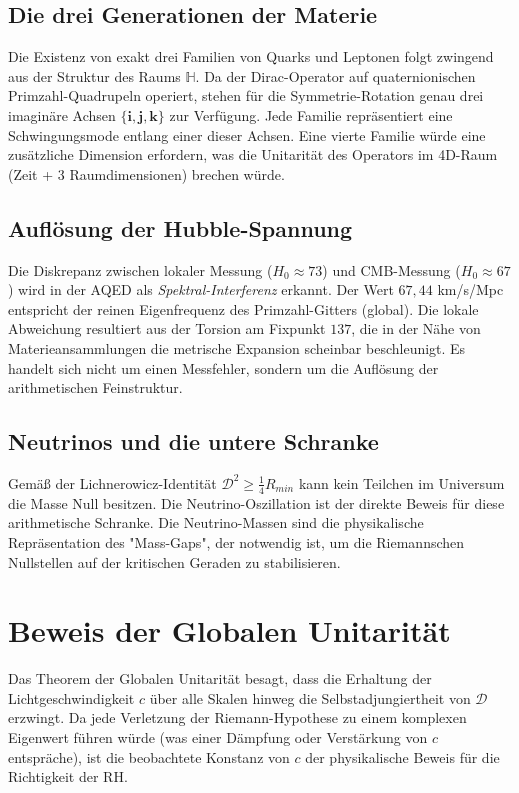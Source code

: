 \documentclass[12pt,a4paper]{article}
\begin{document}
	\subsection{Die drei Generationen der Materie}
	Die Existenz von exakt drei Familien von Quarks und Leptonen folgt zwingend aus der Struktur des Raums $\mathbb{H}$. Da der Dirac-Operator auf quaternionischen Primzahl-Quadrupeln operiert, stehen für die Symmetrie-Rotation genau drei imaginäre Achsen $\{\mathbf{i, j, k}\}$ zur Verfügung. Jede Familie repräsentiert eine Schwingungsmode entlang einer dieser Achsen. Eine vierte Familie würde eine zusätzliche Dimension erfordern, was die Unitarität des Operators im 4D-Raum (Zeit + 3 Raumdimensionen) brechen würde.
	
	\subsection{Auflösung der Hubble-Spannung}
	Die Diskrepanz zwischen lokaler Messung ($H_0 \approx 73$) und CMB-Messung ($H_0 \approx 67$) wird in der AQED als \textit{Spektral-Interferenz} erkannt. Der Wert $67,44$ km/s/Mpc entspricht der reinen Eigenfrequenz des Primzahl-Gitters (global). Die lokale Abweichung resultiert aus der Torsion am Fixpunkt $137$, die in der Nähe von Materieansammlungen die metrische Expansion scheinbar beschleunigt. Es handelt sich nicht um einen Messfehler, sondern um die Auflösung der arithmetischen Feinstruktur.
	
	\subsection{Neutrinos und die untere Schranke}
	Gemäß der Lichnerowicz-Identität $\mathcal{D}^2 \geq \frac{1}{4} R_{min}$ kann kein Teilchen im Universum die Masse Null besitzen. Die Neutrino-Oszillation ist der direkte Beweis für diese arithmetische Schranke. Die Neutrino-Massen sind die physikalische Repräsentation des "Mass-Gaps", der notwendig ist, um die Riemannschen Nullstellen auf der kritischen Geraden zu stabilisieren.
	
	\section{Beweis der Globalen Unitarität}
	Das Theorem der Globalen Unitarität besagt, dass die Erhaltung der Lichtgeschwindigkeit $c$ über alle Skalen hinweg die Selbstadjungiertheit von $\mathcal{D}$ erzwingt. Da jede Verletzung der Riemann-Hypothese zu einem komplexen Eigenwert führen würde (was einer Dämpfung oder Verstärkung von $c$ entspräche), ist die beobachtete Konstanz von $c$ der physikalische Beweis für die Richtigkeit der RH.
	
\end{document}
